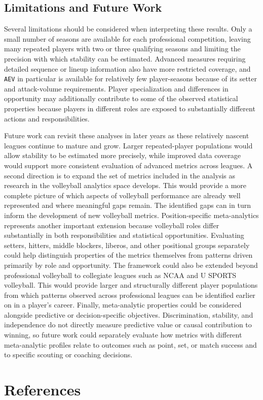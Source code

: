 \documentclass[
  12pt]{article}
\begin{document}
\subsection{Limitations and Future
Work}\label{limitations-and-future-work}

Several limitations should be considered when interpreting these
results. Only a small number of seasons are available for each
professional competition, leaving many repeated players with two or
three qualifying seasons and limiting the precision with which stability
can be estimated. Advanced measures requiring detailed sequence or
lineup information also have more restricted coverage, and \texttt{AEV}
in particular is available for relatively few player-seasons because of
its setter and attack-volume requirements. Player specialization and
differences in opportunity may additionally contribute to some of the
observed statistical properties because players in different roles are
exposed to substantially different actions and responsibilities.

Future work can revisit these analyses in later years as these
relatively nascent leagues continue to mature and grow. Larger
repeated-player populations would allow stability to be estimated more
precisely, while improved data coverage would support more consistent
evaluation of advanced metrics across leagues. A second direction is to
expand the set of metrics included in the analysis as research in the
volleyball analytics space develops. This would provide a more complete
picture of which aspects of volleyball performance are already well
represented and where meaningful gaps remain. The identified gaps can in
turn inform the development of new volleyball metrics. Position-specific
meta-analytics represents another important extension because volleyball
roles differ substantially in both responsibilities and statistical
opportunities. Evaluating setters, hitters, middle blockers, liberos,
and other positional groups separately could help distinguish properties
of the metrics themselves from patterns driven primarily by role and
opportunity. The framework could also be extended beyond professional
volleyball to collegiate leagues such as NCAA and U SPORTS volleyball.
This would provide larger and structurally different player populations
from which patterns observed across professional leagues can be
identified earlier on in a player's career. Finally, meta-analytic
properties could be considered alongside predictive or decision-specific
objectives. Discrimination, stability, and independence do not directly
measure predictive value or causal contribution to winning, so future
work could separately evaluate how metrics with different meta-analytic
profiles relate to outcomes such as point, set, or match success and to
specific scouting or coaching decisions.

\section*{References}\label{references}

\renewcommand{\bibsection}{}

\end{document}
